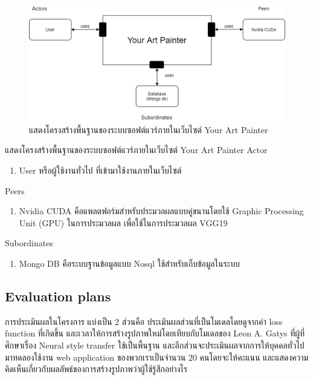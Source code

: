 \documentclass[12pt,oneside,openright,a4paper]{cpe-thai-project}
\begin{document}
\begin{figure}[!h]
  \centering
  \includegraphics[width=14cm]{./image/ArchDesign.png}
  \caption{แสดงโครงสร้างพื้นฐานของระบบซอฟต์แวร์ภายในเว็บไซต์ Your Art Painter}
  \label{fig:ArchDesign}
\end{figure}
แสดงโครงสร้างพื้นฐานของระบบซอฟต์แวร์ภายในเว็บไซต์ Your Art Painter \newline
Actor
\begin{enumerate}
  \item User หรือผู้ใช้งานทั่วไป ที่เข้ามาใช้งานภายในเว็บไซต์ 
\end{enumerate}
Peers 
\begin{enumerate}
  \item Nvidia CUDA คือแพลตฟอร์มสำหรับประมวลผลแบบคู่ขนานโดยใช้ Graphic Processing Unit (GPU) ในการประมวลผล เพื่อใช้ในการประมวลผล VGG19
\end{enumerate}
Subordinates
\begin{enumerate}
  \item Mongo DB คือระบบฐานข้อมูลแบบ Nosql ใช้สำหรับเก็บข้อมูลในระบบ
\end{enumerate}

\subsection{Evaluation plans}
การประเมินผลในโครงการ แบ่งเป็น 2 ส่วนคือ ประเมินผลส่วนที่เป็นโมเดลโดยดูจากค่า loss function ที่เกิดขึ้น และเวลาให้การสร้างรูปภาพใหม่โดยเทียบกับโมเดลของ Leon A. Gatys ที่ผู้ที่ศึกษาเรื่อง Neural style transfer ใช้เป็นพื้นฐาน และอีกส่วนจะประเมินผลจากการให้บุคคลทั่วไปมาทดลองใช้งาน web application ของพวกเราเป็นจำนวน 20 คนโดยจะให้คะแนน และแสดงความคิดเห็นเกี่ยวกับผลลัพธ์ของการสร้างรูปภาพว่าผู้ใช้รู้สึกอย่างไร  
\end{document}
